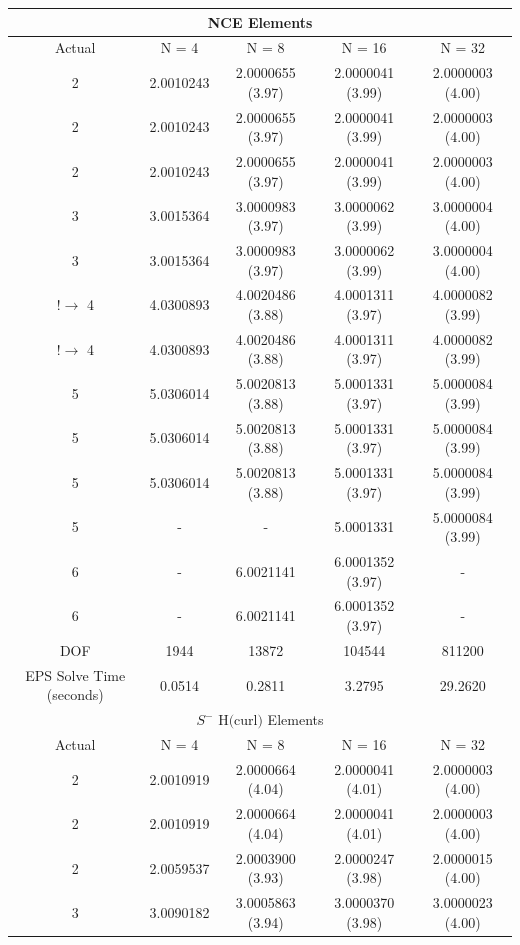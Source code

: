 \documentclass[manuscript,screen]{acmart}
\begin{document}
\begin{center}
\begin{table}
\begin{tabular}{ c c c c c }
\multicolumn{5}{c}{NCE Elements} \\
\hline
Actual & N = 4 & N = 8 & N = 16 & N = 32 \\ 
\hline
2 &2.0010243 & 2.0000655 (3.97) & 2.0000041 (3.99) & 2.0000003 (4.00) \\  
2 & 2.0010243 & 2.0000655 (3.97) & 2.0000041 (3.99) & 2.0000003 (4.00)  \\
2 & 2.0010243 & 2.0000655 (3.97) & 2.0000041 (3.99) & 2.0000003 (4.00)\\
3 & 3.0015364 & 3.0000983 (3.97) & 3.0000062 (3.99) & 3.0000004 (4.00) \\
3 & 3.0015364 & 3.0000983 (3.97) & 3.0000062 (3.99) & 3.0000004 (4.00) \\
$! \rightarrow$ 4 & 4.0300893 & 4.0020486 (3.88) & 4.0001311 (3.97) & 4.0000082 (3.99) \\
$! \rightarrow$ 4 & 4.0300893 & 4.0020486 (3.88) & 4.0001311 (3.97) & 4.0000082 (3.99) \\
5 & 5.0306014 & 5.0020813 (3.88)& 5.0001331 (3.97) & 5.0000084 (3.99) \\
5 & 5.0306014 & 5.0020813 (3.88)& 5.0001331 (3.97) & 5.0000084 (3.99) \\
5 & 5.0306014 & 5.0020813 (3.88) & 5.0001331 (3.97) & 5.0000084 (3.99) \\
5 & - & - & 5.0001331 & 5.0000084 (3.99) \\
6 & - & 6.0021141 & 6.0001352 (3.97) & -  \\
6 & - & 6.0021141 & 6.0001352 (3.97) & - \\
\hline
DOF  & 1944 & 13872 & 104544 & 811200 \\
\hline
EPS Solve Time (seconds) & 0.0514 & 0.2811 & 3.2795 & 29.2620 \\
\hline
\multicolumn{5}{c}{$S^-$ H$($curl$)$ Elements} \\
\hline
Actual & N = 4 & N = 8 & N = 16 & N = 32 \\ 
\hline
2 &2.0010919 & 2.0000664 (4.04) & 2.0000041 (4.01) & 2.0000003 (4.00) \\  
2 & 2.0010919 & 2.0000664 (4.04) & 2.0000041 (4.01) & 2.0000003 (4.00)  \\
2 & 2.0059537 & 2.0003900 (3.93) & 2.0000247 (3.98) & 2.0000015 (4.00)\\
3 & 3.0090182 & 3.0005863 (3.94) & 3.0000370 (3.98) & 3.0000023 (4.00) \\

\end{tabular}
\end{table}
\end{center}
\end{document}

